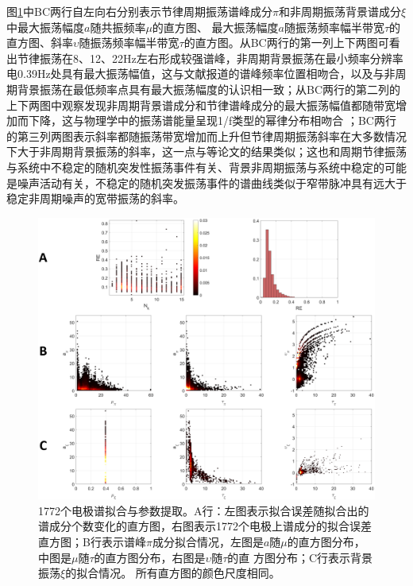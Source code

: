 图\ref{7:para}中BC两行自左向右分别表示节律周期振荡谱峰成分$\pi$和非周期振荡背景谱成分$\xi$中最大振荡幅度$a$随共振频率$\mu$的直方图、
最大振荡幅度$a$随振荡频率幅半带宽$\tau$的直方图、斜率$\upsilon$随振荡频率幅半带宽$\tau$的直方图。从BC两行的第一列上下两图可看出节律振荡在8、12、22Hz左右形成较强谱峰，非周期背景振荡在最小频率分辨率电0.39Hz处具有最大振荡幅值，这与文献\cite{frauscher2018atlas}报道的谱峰频率位置相吻合，以及与非周期背景振荡在最低频率点具有最大振荡幅度的认识相一致；从BC两行的第二列的上下两图中观察发现非周期背景谱成分和节律谱峰成分的最大振荡幅值都随带宽增加而下降，这与物理学中的振荡谱能量呈现1/f类型的幂律分布相吻合
；BC两行的第三列两图表示斜率都随振荡带宽增加而上升但节律周期振荡斜率在大多数情况下大于非周期背景振荡的斜率，这一点与\cite{pascual1988parametric,amador1989structure,amador1990spatiotemporal}等论文的结果类似；这也和周期节律振荡与系统中不稳定的随机突发性振荡事件有关、背景非周期振荡与系统中稳定的可能是噪声活动有关，不稳定的随机突发振荡事件的谱曲线类似于窄带脉冲具有远大于稳定非周期噪声的宽带振荡的斜率。
\begin{figure}[!h]
\includegraphics[width=15cm]{pic/xipi/para.png}
\caption{1772个电极谱拟合与参数提取。A行：左图表示拟合误差随拟合出的谱成分个数变化的直方图，右图表示1772个电极上谱成分的拟合误差直方图；B行表示谱峰$\pi$成分拟合情况，左图是$a$随$\mu$的直方图分布，中图是$\mu$随$\tau$的直方图分布，右图是$\upsilon$随$\tau$的直
方图分布；C行表示背景振荡$\xi$的拟合情况。 所有直方图的颜色尺度相同。}
\label{7:para}
\end{figure}


